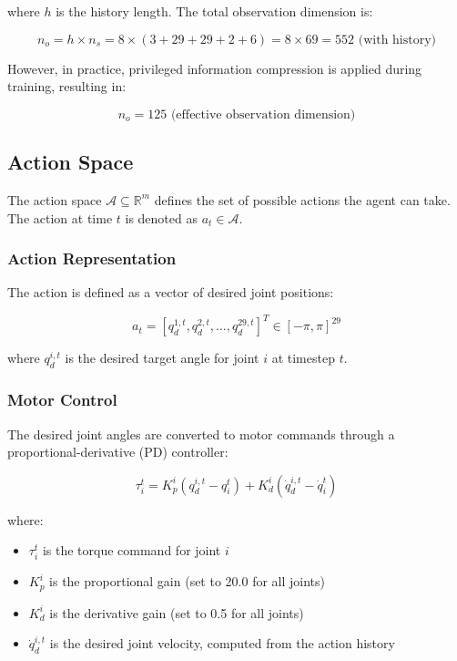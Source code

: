 \documentclass[12pt,a4paper]{article}
\begin{document}
where $h$ is the history length. The total observation dimension is:

\begin{equation}
n_o = h \times n_s = 8 \times (3 + 29 + 29 + 2 + 6) = 8 \times 69 = 552 \text{ (with history)}
\end{equation}

However, in practice, privileged information compression is applied during training, resulting in:

\begin{equation}
n_o = 125 \text{ (effective observation dimension)}
\end{equation}

\subsection{Action Space}

The action space $\mathcal{A} \subseteq \mathbb{R}^m$ defines the set of possible actions the agent can take. The action at time $t$ is denoted as $a_t \in \mathcal{A}$.

\subsubsection{Action Representation}

The action is defined as a vector of desired joint positions:

\begin{equation}
a_t = [q_d^{1,t}, q_d^{2,t}, \ldots, q_d^{29,t}]^T \in [-\pi, \pi]^{29}
\end{equation}

where $q_d^{i,t}$ is the desired target angle for joint $i$ at timestep $t$.

\subsubsection{Motor Control}

The desired joint angles are converted to motor commands through a proportional-derivative (PD) controller:

\begin{equation}
\tau_i^t = K_p^i \left( q_d^{i,t} - q_i^t \right) + K_d^i \left( \dot{q}_d^{i,t} - \dot{q}_i^t \right)
\end{equation}

where:
\begin{itemize}
\item $\tau_i^t$ is the torque command for joint $i$
\item $K_p^i$ is the proportional gain (set to 20.0 for all joints)
\item $K_d^i$ is the derivative gain (set to 0.5 for all joints)
\item $\dot{q}_d^{i,t}$ is the desired joint velocity, computed from the action history
\end{itemize}
\end{document}
